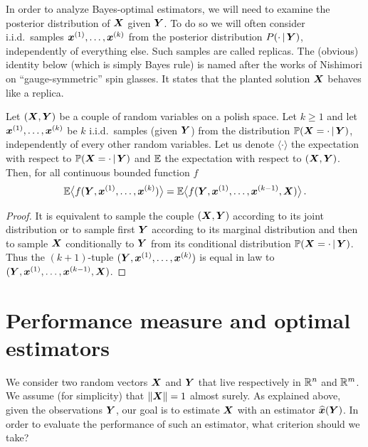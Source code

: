 \documentclass[12pt,nocut]{article}
\begin{document}
In order to analyze Bayes-optimal estimators, we will need to examine the posterior distribution of ${\boldsymbol X}$ given ${\boldsymbol Y}$.
To do so we will often consider i.i.d.\ samples ${\boldsymbol x}^{(1)}, \dots, {\boldsymbol x}^{(k)}$ from the posterior distribution $P( \cdot \, | \, {\boldsymbol Y} )$, independently of everything else. Such samples are called replicas. The (obvious) identity below (which is simply Bayes rule)
is named after the works of Nishimori \cite{nishimori1980exact,nishimori1981internal} on ``gauge-symmetric'' spin glasses.
It states that the planted solution ${\boldsymbol X}$ behaves like a replica.

\begin{proposition} \label{prop:nishimori}
	Let $({\boldsymbol X},{\boldsymbol Y})$ be a couple of random variables on a polish space. Let $k \geq 1$ and let ${\boldsymbol x}^{(1)}, \dots, {\boldsymbol x}^{(k)}$ be $k$ i.i.d.\ samples (given ${\boldsymbol Y}$) from the distribution $\mathbb{P}({\boldsymbol X}=\cdot \, | \, {\boldsymbol Y})$, independently of every other random variables. Let us denote $\langle \cdot \rangle$ the expectation with respect to $\mathbb{P}({\boldsymbol X}=\cdot \, | \, {\boldsymbol Y})$ and $\mathbb{E}$ the expectation with respect to $({\boldsymbol X},{\boldsymbol Y})$. Then, for all continuous bounded function $f$
	$$
	\mathbb{E} \big\langle f({\boldsymbol Y},{\boldsymbol x}^{(1)}, \dots, {\boldsymbol x}^{(k)}) \big\rangle
	=
	\mathbb{E} \big\langle f({\boldsymbol Y},{\boldsymbol x}^{(1)}, \dots, {\boldsymbol x}^{(k-1)}, {\boldsymbol X}) \big\rangle\,.
	$$
\end{proposition}
\begin{proof}
It is equivalent to sample the couple $({\boldsymbol X},{\boldsymbol Y})$ according to its joint distribution or to sample first ${\boldsymbol Y}$ according to its marginal distribution and then to sample ${\boldsymbol X}$ conditionally to ${\boldsymbol Y}$ from its conditional distribution $\mathbb{P}({\boldsymbol X}=\cdot \,|\,{\boldsymbol Y})$. Thus the $(k+1)$-tuple $({\boldsymbol Y},{\boldsymbol x}^{(1)}, \dots,{\boldsymbol x}^{(k)})$ is equal in law to $({\boldsymbol Y},{\boldsymbol x}^{(1)},\dots,{\boldsymbol x}^{(k-1)},{\boldsymbol X})$.
\end{proof}


\section{Performance measure and optimal estimators}\label{sec:performance}

We consider two random vectors ${\boldsymbol X}$ and ${\boldsymbol Y}$ that live respectively in $\mathbb{R}^n$ and $\mathbb{R}^m$. 
We assume (for simplicity) that $\|{\boldsymbol X}\| = 1$ almost surely. 
As explained above, given the observations ${\boldsymbol Y}$, our goal is to estimate ${\boldsymbol X}$ with an estimator $\widehat{{\boldsymbol x}}({\boldsymbol Y})$. 
In order to evaluate the performance of such an estimator, what criterion should we take?
\end{document}
